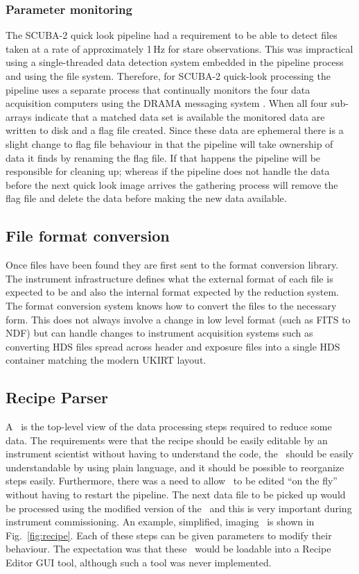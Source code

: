 \documentclass[final,authoryear,5p,times,twocolumn]{elsarticle}
\begin{document}
\subsubsection{Parameter monitoring}

The SCUBA-2 quick look pipeline \citep{2005ASPC..347..585G} had a
requirement to be able to detect files taken at a rate of
approximately 1\,Hz for stare observations. This was impractical using
a single-threaded data detection system embedded in the pipeline process and
using the file system. Therefore, for SCUBA-2 quick-look processing the
pipeline uses a separate process that continually monitors the
four data acquisition computers using the DRAMA messaging system
\citep{1995SPIE.2479...62B}. When all four sub-arrays indicate that a
matched data set is available the monitored data are written to disk
and a flag file created. Since these data are ephemeral there is a
slight change to flag file behaviour in that the pipeline will take
ownership of data it finds by renaming the flag file. If that happens
the pipeline will be responsible for cleaning up; whereas if the
pipeline does not handle the data before the next quick look image
arrives the gathering process will remove the flag file and delete the
data before making the new data available.

\subsection{File format conversion}

Once files have been found they are first sent to the format
conversion library. The instrument infrastructure defines what the
external format of each file is expected to be and also the internal format
expected by the reduction system. The format conversion system knows
how to convert the files to the necessary form. This does not always
involve a change in low level format (such as FITS to NDF) but can
handle changes to instrument acquisition systems such as converting
HDS files spread across header and exposure files into a single HDS
container matching the modern UKIRT layout.

\subsection{Recipe Parser}

A \recipe\ is the top-level view of the data processing steps
required to reduce some data. The requirements were that the recipe
should be easily editable by an instrument scientist without having to
understand the code, the \recipe\ should be easily understandable by
using plain language, and it should be possible to reorganize steps
easily. Furthermore, there was a need to allow \recipes\ to be edited
``on the fly'' without having to restart the pipeline. The next data file
to be picked up would be processed using the modified version of the
\recipe\ and this is very important during instrument commissioning. An
example, simplified, imaging \recipe\ is shown in Fig.\
\ref{fig:recipe}. Each of these steps can be given parameters to
modify their behaviour. The expectation was that these \recipes\ would
be loadable into a Recipe Editor GUI tool, although such a tool was
never implemented.
\end{document}
